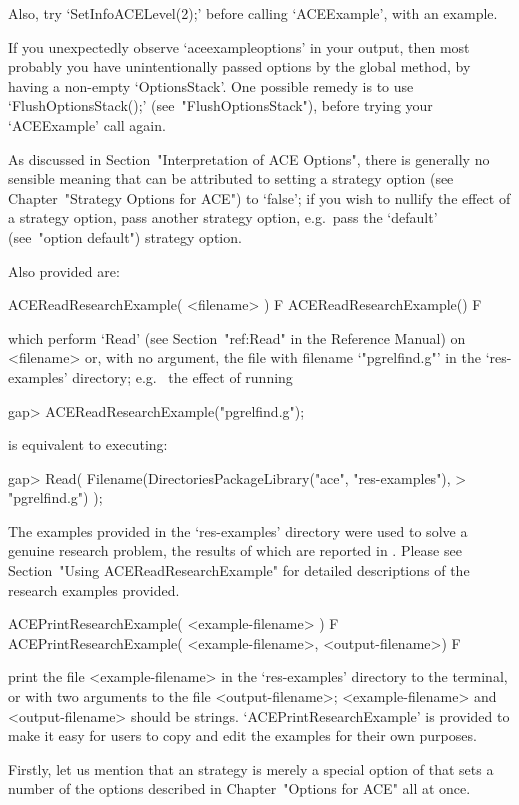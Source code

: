 Also, try `SetInfoACELevel(2);' before  calling `ACEExample', with  an
example.

If you unexpectedly observe `aceexampleoptions' in your  output,  then
most probably you have unintentionally passed options  by  the  global
method, by having a non-empty `OptionsStack'. One possible  remedy  is
to use `FlushOptionsStack();' (see~"FlushOptionsStack"), before trying
your `ACEExample' call again.

As discussed in Section~"Interpretation  of  ACE  Options",  there  is
generally no sensible meaning that can  be  attributed  to  setting  a
strategy option (see Chapter~"Strategy Options for ACE")  to  `false';
if you wish to nullify the effect of a strategy option,  pass  another
strategy  option,  e.g.~pass  the  `default'  (see~"option   default")
strategy option.

Also provided are:

\> ACEReadResearchExample( <filename> ) F
\> ACEReadResearchExample() F

which perform `Read' (see Section~"ref:Read" in the  {\GAP}  Reference
Manual) on <filename> or, with no argument,  the  file  with  filename
`"pgrelfind.g"' in the `res-examples' directory; e.g.~ the  effect  of
running

\beginexample
gap> ACEReadResearchExample("pgrelfind.g");
\endexample

is equivalent to executing:

\beginexample
gap> Read( Filename(DirectoriesPackageLibrary("ace", "res-examples"),
>                   "pgrelfind.g") );
\endexample

The examples provided in the `res-examples'  directory  were  used  to
solve a genuine research problem, the results of which are reported in
\cite{CHHR00}. Please see Section~"Using  ACEReadResearchExample"  for
detailed descriptions of the research examples provided.

\> ACEPrintResearchExample( <example-filename> ) F
\> ACEPrintResearchExample( <example-filename>, <output-filename>) F

print the file <example-filename> in the `res-examples'  directory  to
the terminal, or with two arguments  to  the  file  <output-filename>;
<example-filename>   and   <output-filename>   should   be    strings.
`ACEPrintResearchExample' is provided to make it  easy  for  users  to
copy and edit the examples for their own purposes.

\enditems

Firstly, let us mention that an {\ACE} strategy is  merely  a  special
option of {\ACE} that sets  a  number  of  the  options  described  in
Chapter~"Options for ACE" all at once.

